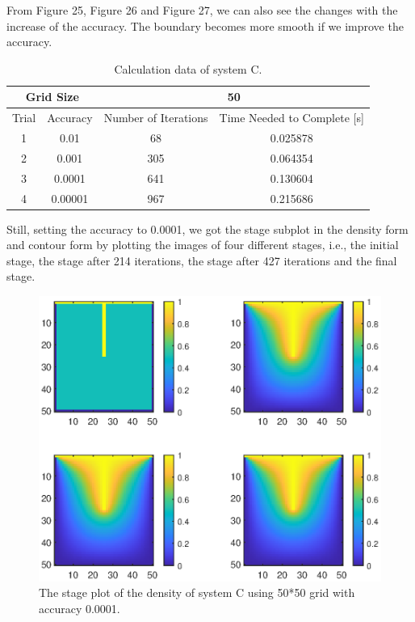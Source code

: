 \documentclass[12pt]{report}
\begin{document}
From Figure 25, Figure 26 and Figure 27, we can also see the changes with the increase of the accuracy. The boundary becomes more smooth if we improve the accuracy.
\begin{table}[H]
    \centering
    \begin{tabular}{|c|c|c|c|}
        \hline
        \multicolumn{2}{|c|}{Grid Size}&\multicolumn{2}{c|}{50}\\
        \hline
         Trial&Accuracy&Number of Iterations&Time Needed to Complete [s]\\
         \hline
        1 & 0.01 & 68 & 0.025878 \\
        \hline
        2 &0.001& 305 &  0.064354  \\
        \hline
        3 & 0.0001 & 641  & 0.130604  \\
        \hline
        4 & 0.00001 & 967 & 0.215686 \\
        \hline
    \end{tabular}
    \caption{Calculation data of system C.}
\end{table}
Still, setting the accuracy to 0.0001, we got the stage subplot in the density form and contour form by plotting the images of four different stages, i.e., the initial stage, the stage after 214 iterations, the stage after 427 iterations and the final stage.
\begin{figure}[H]
    \centering
    \includegraphics[width=0.8\linewidth]{CStageDensity.eps}
    \caption{The stage plot of the density of system C using 50*50 grid with accuracy 0.0001.}
\end{figure}
\end{document}
